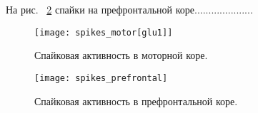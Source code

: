 На рис. ~\ref{fig:spikes_prefrontal} спайки на префронтальной коре.....................

\begin{figure}
	\centering
	\texttt{[image: spikes\_motor[glu1]]}
	\caption{Спайковая активность в моторной коре.}
	\label{fig:spikes_motor}
\end{figure}

\begin{figure}
	\centering
	\texttt{[image: spikes\_prefrontal]}
	\caption{Спайковая активность в префронтальной коре.}
	\label{fig:spikes_prefrontal}
\end{figure}




